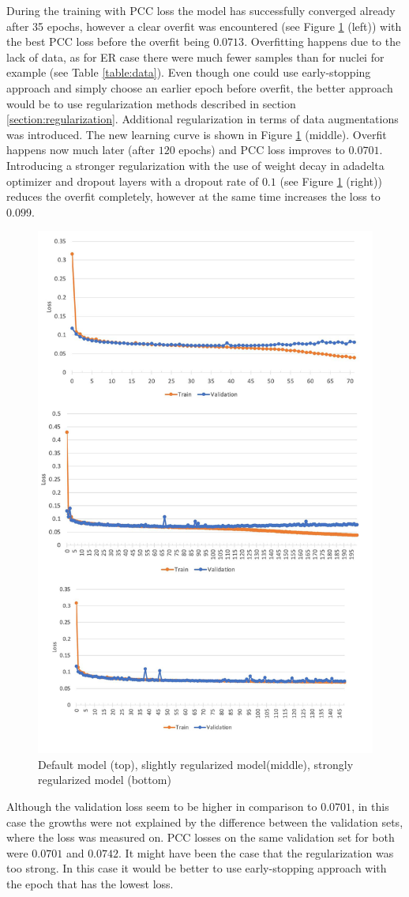 During the training with PCC loss the model has successfully converged already after 35 epochs, however a clear overfit was encountered (see Figure \ref{fig:er-overfit} (left)) with the best PCC loss before the overfit being $0.0713$. Overfitting happens due to the lack of data, as for ER case there were much fewer samples than for nuclei for example (see Table \ref{table:data}). Even though one could use early-stopping approach and simply choose an earlier epoch before overfit, the better approach would be to use regularization methods described in section \ref{section:regularization}. Additional regularization in terms of data augmentations was introduced. The new learning curve is shown in Figure \ref{fig:er-overfit} (middle). Overfit happens now much later (after $120$ epochs) and PCC loss improves to $0.0701$. Introducing a stronger regularization with the use of weight decay in adadelta optimizer and dropout layers with a dropout rate of $0.1$ (see Figure \ref{fig:er-overfit} (right)) reduces the overfit completely, however at the same time increases the loss to $0.099$.
\begin{figure}[H]
	\begin{center}
		\includegraphics[width=0.6\linewidth]{bilder/ER/segmentation/reg-not-reg.png}
		\caption{Default model (top), slightly regularized model(middle), strongly regularized model (bottom)}\label{fig:er-overfit}
	\end{center}
\end{figure}

Although the validation loss seem to be higher in comparison to $0.0701$, in this case the growths were not explained by the difference between the validation sets, where the loss was measured on. PCC losses on the same validation set for both were $0.0701$ and $0.0742$. It might have been the case that the regularization was too strong. In this case it would be better to use early-stopping approach with the epoch that has the lowest loss.
